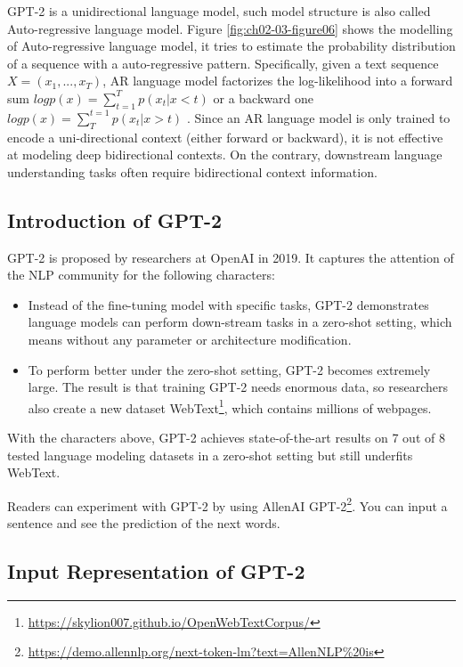 \documentclass[]{krantz}
\renewcommand{\href}[2]{#2\footnote{\url{#1}}}
\begin{document}
GPT-2 is a unidirectional language model, such model structure is also called Auto-regressive language model. Figure \ref{fig:ch02-03-figure06} shows the modelling of Auto-regressive language model, it tries to estimate the probability distribution of a sequence with a auto-regressive pattern. Specifically, given a text sequence \(X = (x_1,...,x_T)\), AR language model factorizes the log-likelihood into a forward sum \(logp(x) = \sum^T_{t=1} p(x_t|x<t)\) or a backward one \(logp(x) = \sum^{t=1}_{T} p(x_t|x>t)\) \citet{yang2019xlnet}. Since an AR language model is only trained to encode a uni-directional context (either forward or backward), it is not effective at modeling deep bidirectional contexts. On the contrary, downstream language understanding tasks often require bidirectional context information.

\hypertarget{introduction-of-gpt-2}{%
\subsection{Introduction of GPT-2}\label{introduction-of-gpt-2}}

GPT-2 is proposed by researchers at OpenAI in 2019. It captures the attention of the NLP community for the following characters:

\begin{itemize}
\item
  Instead of the fine-tuning model with specific tasks, GPT-2 demonstrates language models can perform down-stream tasks in a zero-shot setting, which means without any parameter or architecture modification.
\item
  To perform better under the zero-shot setting, GPT-2 becomes extremely large. The result is that training GPT-2 needs enormous data, so researchers also create a new dataset \href{https://skylion007.github.io/OpenWebTextCorpus/}{WebText}, which contains millions of webpages.
\end{itemize}

With the characters above, GPT-2 achieves state-of-the-art results on 7 out of 8 tested language modeling datasets in a zero-shot setting but still underfits WebText.

Readers can experiment with GPT-2 by using \href{https://demo.allennlp.org/next-token-lm?text=AllenNLP\%20is}{AllenAI GPT-2}. You can input a sentence and see the prediction of the next words.

\hypertarget{input-representation-of-gpt-2}{%
\subsection{Input Representation of GPT-2}\label{input-representation-of-gpt-2}}
\end{document}
